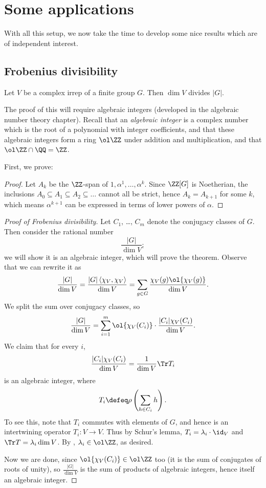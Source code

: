 \chapter{Some applications}
With all this setup, we now take the time to develop some nice
results which are of independent interest.

\section{Frobenius divisibility}
\begin{theorem}
	Let $V$ be a complex irrep of a finite group $G$.
	Then $\dim V$ divides $|G|$.
\end{theorem}
The proof of this will require algebraic integers
(developed in the algebraic number theory chapter).
Recall that an \emph{algebraic integer} is a complex number
which is the root of a polynomial with integer coefficients,
and that these algebraic integers form a ring $\ol\ZZ$
under addition and multiplication, and that $\ol\ZZ \cap \QQ = \ZZ$.

First, we prove:
\newcommand{\tempuuujbhtkx}{$\ZZ[G]$}
\begin{proof}
	Let $A_k$ be the $\ZZ$-span of $1, \alpha^1, \dots, \alpha^k$.
	Since $\ZZ[G]$ is Noetherian,
	the inclusions $A_0 \subseteq A_1 \subseteq A_2 \subseteq \dots$
	cannot all be strict, hence $A_k = A_{k+1}$ for some $k$,
	which means $\alpha^{k+1}$ can be expressed in terms of
	lower powers of $\alpha$.
\end{proof}

\begin{proof}
	[Proof of Frobenius divisibility]
	Let $C_1$, \dots, $C_m$ denote the conjugacy classes of $G$.
	Then consider the rational number \[ \frac{|G|}{\dim V}; \]
	we will show it is an algebraic integer, which will prove the theorem.
	Observe that we can rewrite it as
	\[
		\frac{|G|}{\dim V}
		= \frac{|G| \left< \chi_V, \chi_V \right>}{\dim V}
		= \sum_{g \in G} \frac{\chi_V(g) \ol{\chi_V(g)}}{\dim V}.
	\]
	We split the sum over conjugacy classes, so
	\[
		\frac{|G|}{\dim V}
		=
		\sum_{i=1}^m \ol{\chi_V(C_i)} \cdot \frac{|C_i| \chi_V(C_i)}{\dim V}.
	\]
	We claim that for every $i$,
	\[ \frac{|C_i| \chi_V(C_i)}{\dim V}
		= \frac{1}{\dim V} \Tr T_i \]
	is an algebraic integer,
	where \[ T_i \defeq \rho\left(\sum_{h \in C_i} h\right). \]
	To see this, note that $T_i$ commutes with elements of $G$,
	and hence is an intertwining operator $T_i : V \to V$.
	Thus by Schur's lemma, $T_i = \lambda_i \cdot \id_V$
	and $\Tr T = \lambda_i \dim V$.
	By , $\lambda_i \in \ol\ZZ$, as desired.
	
	Now we are done, since $ \in \ol\ZZ$ too
	(it is the sum of conjugates of roots of unity),
	so $$ is the sum of products of algebraic integers,
	hence itself an algebraic integer.
\end{proof}

